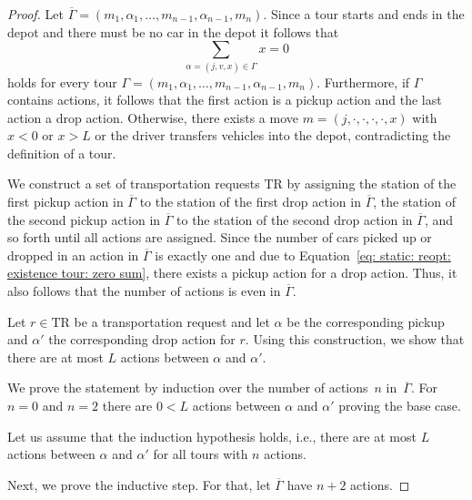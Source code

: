 \documentclass[english]{llncs}
\numberwithin{sublemma}{lemma}
\newcommand{\ntourd}{\ensuremath{n}}
\newcommand{\capd}{\ensuremath{L}}
\newcommand{\tourd}{\ensuremath{\Gamma}}
\newcommand{\action}{\ensuremath{\alpha}}
\newcommand{\move}{\ensuremath{m}}
\newcommand{\TR}{\mathrm{TR}}
\begin{document}
\begin{proof}
Let $\overline{\tourd} = (\move_1, \action_1, \dotsc, \move_{\ntourd - 1}, \action_{\ntourd - 1}, \move_{\ntourd})$.
Since a tour starts and ends in the depot and there must be no car in the depot it follows that
\begin{equation}\label{eq: static: reopt: existence tour: zero sum}
  \sum_{\action = (j, v, x) \in \tourd} x = 0
\end{equation}
holds for every tour $\tourd = (\move_1, \action_1, \dotsc, \move_{\ntourd - 1}, \action_{\ntourd - 1}, \move_{\ntourd})$.
Furthermore, if $\tourd$ contains actions, it follows that the first action is a pickup action and the last action a drop action.
Otherwise, there exists a move $\move = (j, \cdot, \cdot, \cdot, \cdot, x)$ with $x < 0$ or $x > \capd$ or the driver transfers vehicles into the depot, contradicting the definition of a tour.


We construct a set of transportation requests $\TR$ by assigning the station of the first pickup action in $\overline{\tourd}$ to the station of the first drop action in $\overline{\tourd}$,
the station of the second pickup action in $\overline{\tourd}$ to the station of the second drop action in $\overline{\tourd}$, and so forth until all actions are assigned.
Since the number of cars picked up or dropped in an action in $\overline{\tourd}$ is exactly one and due to Equation~\eqref{eq: static: reopt: existence tour: zero sum},
there exists a pickup action for a drop action.
Thus, it also follows that the number of actions is even in $\overline{\tourd}$.



Let $r \in \TR$ be a transportation request and let $\action$ be the corresponding pickup and $\action'$ the corresponding drop action for $r$.
Using this construction, we show that there are at most $\capd$ actions between $\action$ and $\action'$.

We prove the statement by induction over the number of actions~$\ntourd$ in~$\overline{\tourd}$.
For $\ntourd = 0$ and $\ntourd = 2$ there are $0 < \capd$ actions between $\action$ and $\action'$ proving the base case.

Let us assume that the induction hypothesis holds, i.e., there are at most $\capd$ actions between $\action$ and $\action'$ for all tours with $\ntourd$ actions.

Next, we prove the inductive step.
For that, let $\overline{\tourd}$ have $\ntourd + 2$ actions.


\end{proof}
\end{document}
